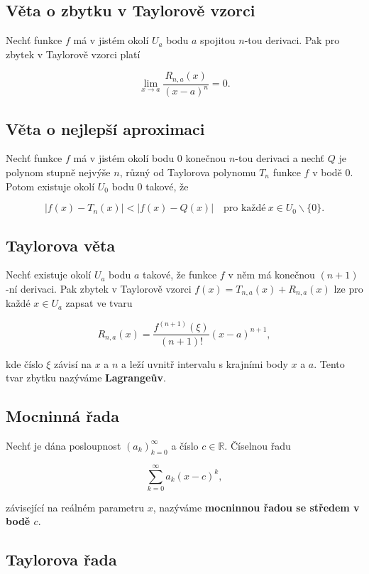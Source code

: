 \subsection*{Věta o zbytku v Taylorově vzorci}

Nechť funkce $f$ má v jistém okolí $U_a$ bodu $a$ spojitou $n$-tou derivaci.
Pak pro zbytek v Taylorově vzorci platí

\[ \lim_{x\to a} \frac{R_{n,a}(x)}{(x-a)^n} = 0. \]

\subsection*{Věta o nejlepší aproximaci}

Nechť funkce $f$ má v jistém okolí bodu $0$ konečnou $n$-tou derivaci a nechť
$Q$ je polynom stupně nejvýše $n$, různý od Taylorova polynomu $T_n$ funkce $f$
v bodě $0$. Potom existuje okolí $U_0$ bodu $0$ takové, že

\[ |f(x) - T_n(x)| < |f(x) - Q(x)| \quad \textrm{pro každé} \ x\in U_0 \smallsetminus \{0\}. \]

\subsection*{Taylorova věta}

Nechť existuje okolí $U_a$ bodu $a$ takové, že funkce $f$ v něm má konečnou
$(n+1)$ -ní derivaci. Pak zbytek v Taylorově vzorci $f(x) = T_{n,a}(x) +
    R_{n,a}(x)$ lze pro každé $x\in U_a$ zapsat ve tvaru

\[ R_{n,a}(x) = \frac{f^{(n+1)}(\xi)}{(n+1)!} (x-a)^{n+1}, \]

\noindent kde číslo $\xi$ závisí na $x$ a $n$ a leží uvnitř intervalu s krajními body $x$
a $a$. Tento tvar zbytku nazýváme \textbf{Lagrangeův}.

\subsection*{Mocninná řada}

Nechť je dána posloupnost $(a_k)_{k=0}^\infty$ a číslo $c\in\mathbb{R}$.
Číselnou řadu

\[ \sum_{k=0}^\infty a_k (x-c)^k, \]

\noindent závisející na reálném parametru $x$, nazýváme \textbf{mocninnou řadou se
    středem v bodě $c$}.

\subsection*{Taylorova řada}


